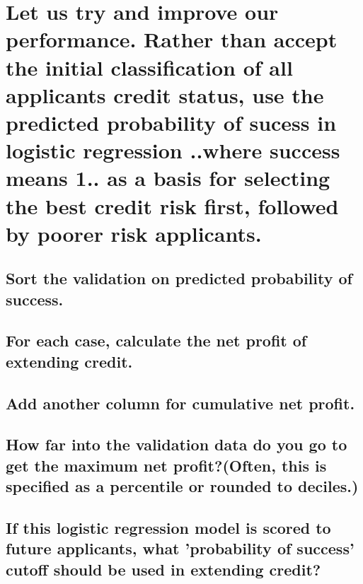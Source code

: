 \section{Let us try and improve our performance. Rather than accept the initial classification of all applicants credit status, use the predicted probability of sucess in logistic regression ..where success means 1.. as a basis for selecting the best credit risk first, followed by poorer risk applicants.} \label{appendix4}
\subsection{Sort the validation on predicted probability of success.}
\subsection{For each case, calculate the net profit of extending credit.}
\subsection{Add another column for cumulative net profit.}
\subsection{How far into the validation data do you go to get the maximum net profit?(Often, this is specified as a percentile or rounded to deciles.)}
\subsection{If this logistic regression model is scored to future applicants, what 'probability of success' cutoff should be used in extending credit?}